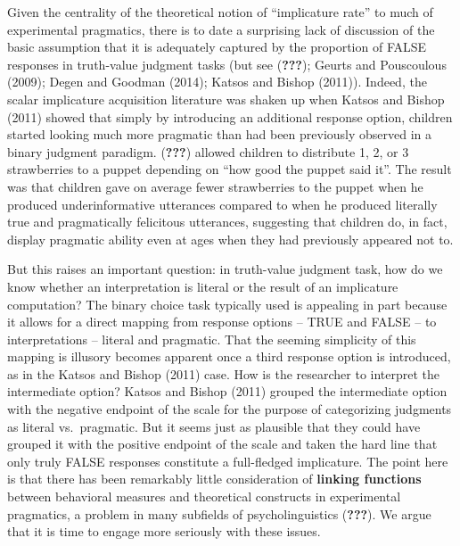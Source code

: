 \documentclass[floatsintext,man]{apa6}
\theoremstyle{definition}
\theoremstyle{definition}
\theoremstyle{definition}
\theoremstyle{remark}
\begin{document}
Given the centrality of the theoretical notion of \enquote{implicature
rate} to much of experimental pragmatics, there is to date a surprising
lack of discussion of the basic assumption that it is adequately
captured by the proportion of FALSE responses in truth-value judgment
tasks (but see ({\textbf{???}}); Geurts and Pouscoulous (2009); Degen
and Goodman (2014); Katsos and Bishop (2011)). Indeed, the scalar
implicature acquisition literature was shaken up when Katsos and Bishop
(2011) showed that simply by introducing an additional response option,
children started looking much more pragmatic than had been previously
observed in a binary judgment paradigm. ({\textbf{???}}) allowed
children to distribute 1, 2, or 3 strawberries to a puppet depending on
\enquote{how good the puppet said it}. The result was that children gave
on average fewer strawberries to the puppet when he produced
underinformative utterances compared to when he produced literally true
and pragmatically felicitous utterances, suggesting that children do, in
fact, display pragmatic ability even at ages when they had previously
appeared not to.

But this raises an important question: in truth-value judgment task, how
do we know whether an interpretation is literal or the result of an
implicature computation? The binary choice task typically used is
appealing in part because it allows for a direct mapping from response
options -- TRUE and FALSE -- to interpretations -- literal and
pragmatic. That the seeming simplicity of this mapping is illusory
becomes apparent once a third response option is introduced, as in the
Katsos and Bishop (2011) case. How is the researcher to interpret the
intermediate option? Katsos and Bishop (2011) grouped the intermediate
option with the negative endpoint of the scale for the purpose of
categorizing judgments as literal vs.~pragmatic. But it seems just as
plausible that they could have grouped it with the positive endpoint of
the scale and taken the hard line that only truly FALSE responses
constitute a full-fledged implicature. The point here is that there has
been remarkably little consideration of \textbf{linking functions}
between behavioral measures and theoretical constructs in experimental
pragmatics, a problem in many subfields of psycholinguistics
({\textbf{???}}). We argue that it is time to engage more seriously with
these issues.
\end{document}
